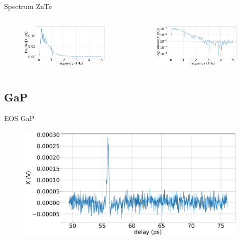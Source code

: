 \documentclass[aspectratio=1610, 9pt]{beamer}
\begin{document}
\begin{frame}{Spectrum ZnTe}
  \begin{columns}
    \begin{column}{.5\textwidth}
  \begin{figure}
    \includegraphics[width=\textwidth]{images/2_11_30_20normalFX.pdf}
  \end{figure}
  \end{column}
  \begin{column}{.5\textwidth}
    \begin{figure}
      \includegraphics[width=\textwidth]{images/2_11_30_20normallog(FX).pdf}
    \end{figure}    
  \end{column}
  \end{columns}
\end{frame}

\subsection{GaP}
\begin{frame}{EOS GaP}
  \begin{figure}
    \includegraphics[width=\textwidth]{images/GaP14_55_42normalX.pdf}
  \end{figure}
\end{frame}
\end{document}
